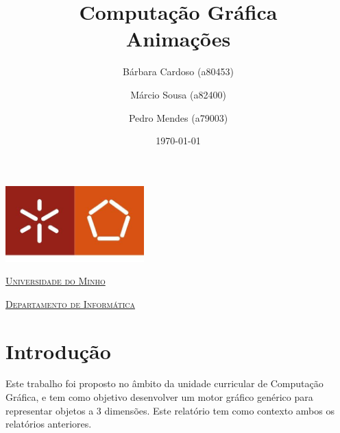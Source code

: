 \documentclass[a4paper]{article}
\begin{document}
\title{Computação Gráfica\\ Animações}
\author{Bárbara Cardoso (a80453) \and Márcio Sousa (a82400)
\and Pedro Mendes (a79003)}
\date{\today}

\begin{titlepage}

    \thispagestyle{empty}
    \begin{center}
        \begin{minipage}{0.75\linewidth}
            \centering
            \includegraphics[width=0.4\textwidth]{eng.jpeg}\par\vspace{1cm}
            \vspace{1.5cm}
            \href{https://www.uminho.pt/PT}
            {\scshape\LARGE Universidade do Minho} \par
            \vspace{1cm}
            \href{https://www.di.uminho.pt/}
            {\scshape\Large Departamento de Informática} \par
            \vspace{1.5cm}

            \maketitle
        \end{minipage}
    \end{center}

\end{titlepage}

\tableofcontents

\pagebreak

\section{Introdução}
Este trabalho foi proposto no âmbito da unidade curricular de Computação
Gráfica, e tem como objetivo desenvolver um motor gráfico genérico para
representar objetos a 3 dimensões. Este relatório tem como contexto ambos os
relatórios anteriores.
\end{document}
